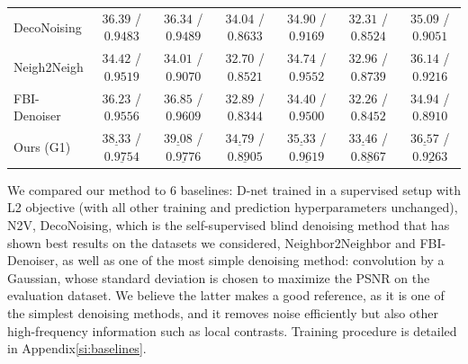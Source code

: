 \documentclass[lettersize,journal]{IEEEtran}
\begin{document}
\begin{table}[!htbp]
\begin{center}
\begin{small}
\begin{sc}
{\begin{tabular}{lcccccc}
DecoNoising & $36.39$ / $0.9483$ & $36.34$ / $0.9489$ & $34.04$ / $0.8633$ & $34.90$ / $0.9169$ & $32.31$ / $0.8524$ & $35.09$ / $0.9051$\\
Neigh2Neigh & $34.42$ / $0.9519$ & $34.01$ / $0.9070$ & $32.70$ / $0.8521$ & $34.74$ / $0.9552$ & $32.96$ / $0.8739$ & $36.14$ / $0.9216$\\
FBI-Denoiser & $36.23$ / $0.9556$ & $36.85$ / $0.9609$ & $32.89$ / $0.8344$ & $34.40$ / $0.9500$ & $32.26$ / $0.8452$ & $34.94$ / $0.8910$\\
Ours (G1) & $\underline{38.33}$ / $\underline{0.9754}$ & $\underline{39.08}$ / $\underline{0.9776}$ & $\underline{34.79}$ / $\underline{0.8905}$ & $\underline{35.33}$ / $\underline{0.9619}$ & $\underline{33.46}$ / $\underline{0.8867}$ & $\underline{36.57}$ / $\underline{0.9263}$\\

\bottomrule
\end{tabular}
}
\end{sc}
\end{small}
\end{center}
\vskip -0.1in
\end{table}

We compared our method to 6 baselines: D-net trained in a supervised setup with L2 objective (with all other training and prediction hyperparameters unchanged), N2V, DecoNoising, which is the self-supervised blind denoising method that has shown best results on the datasets we considered, Neighbor2Neighbor and FBI-Denoiser, as well as one of the most simple denoising method: convolution by a Gaussian, whose standard deviation is chosen to maximize the PSNR on the evaluation dataset.
We believe the latter makes a good reference, as it is one of the simplest denoising methods, and it removes noise efficiently but also other high-frequency information such as local contrasts. Training procedure is detailed in Appendix\ref{si:baselines}.
\end{document}
